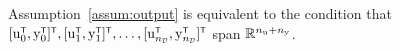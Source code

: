 \begin{remark}
Assumption~\ref{assum:output} is equivalent to the condition that $[\vcu_0^\tr, \vcy_0^\tr]^\tr, [\vcu_1^\tr, \vcy_1^\tr]^\tr, \ldots, [\vcu_\nsmD^\tr, \vcy_\nsmD^\tr]^\tr$ span ${\mathbb{R}}^{n_{ \mathrm{u} }+n_{ \mathrm{y} }}$.
\end{remark}

